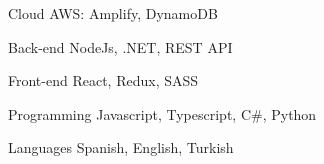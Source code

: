 

\begin{cvskills}

  \cvskill
    {Cloud} %
    {AWS: Amplify, DynamoDB } %

  \cvskill
    {Back-end} %
    {NodeJs, .NET, REST API} %

  \cvskill
    {Front-end} %
    {React, Redux, SASS} %

  \cvskill
    {Programming} %
    {Javascript, Typescript, C\#, Python} %

  \cvskill
    {Languages} %
    {Spanish, English, Turkish} %

\end{cvskills}
